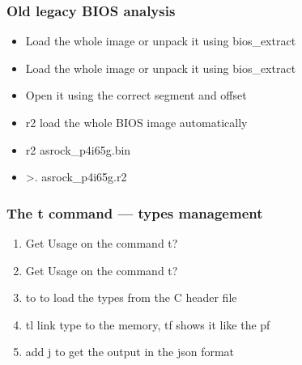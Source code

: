 \documentclass[10pt,pdf,utf8,english,compress,hyperref={unicode}]{beamer}
\begin{document}
\begin{frame}[fragile]
  \frametitle{Old legacy BIOS analysis}
  \begin{itemize}
\ifxetex
	\item Load the whole image or unpack it using bios\_extract
\else
    \item Load the whole image or unpack it using bios\_extract 
\fi
	\item Open it using the correct segment and offset
	\item r2 load the whole BIOS image automatically
	\item r2 asrock\_p4i65g.bin
	\item >. asrock\_p4i65g.r2
  \end{itemize}
\end{frame}

\begin{frame}[fragile]
  \frametitle{The t command — types management}
  \begin{enumerate}
\ifxetex
  \item Get Usage on the command \alert{t?}
\else
  \item Get Usage on the command \alert{t?} 
\fi
  \item \alert{to} to load the types from the C header file
  \item \alert{tl} link type to the memory, \alert{tf} shows it like the pf
  \item add \alert{j} to get the output in the json format
 \end{enumerate}
\end{frame}

\end{document}
